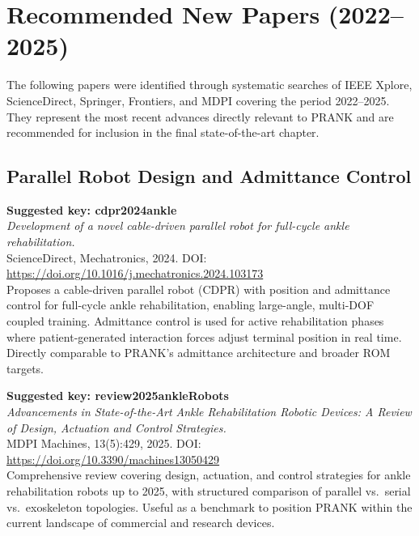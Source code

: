 \section{Recommended New Papers (2022--2025)}

The following papers were identified through systematic searches of IEEE Xplore, ScienceDirect, Springer, Frontiers, and MDPI covering the period 2022--2025.
They represent the most recent advances directly relevant to PRANK and are recommended for inclusion in the final state-of-the-art chapter.

\subsection*{Parallel Robot Design and Admittance Control}

\textbf{Suggested key: cdpr2024ankle} \\
\textit{Development of a novel cable-driven parallel robot for full-cycle ankle rehabilitation.} \\
ScienceDirect, Mechatronics, 2024. DOI: \url{https://doi.org/10.1016/j.mechatronics.2024.103173} \\
Proposes a cable-driven parallel robot (CDPR) with position and admittance control for full-cycle ankle rehabilitation, enabling large-angle, multi-DOF coupled training. Admittance control is used for active rehabilitation phases where patient-generated interaction forces adjust terminal position in real time. Directly comparable to PRANK's admittance architecture and broader ROM targets.

\textbf{Suggested key: review2025ankleRobots} \\
\textit{Advancements in State-of-the-Art Ankle Rehabilitation Robotic Devices: A Review of Design, Actuation and Control Strategies.} \\
MDPI Machines, 13(5):429, 2025. DOI: \url{https://doi.org/10.3390/machines13050429} \\
Comprehensive review covering design, actuation, and control strategies for ankle rehabilitation robots up to 2025, with structured comparison of parallel vs.\ serial vs.\ exoskeleton topologies. Useful as a benchmark to position PRANK within the current landscape of commercial and research devices.

